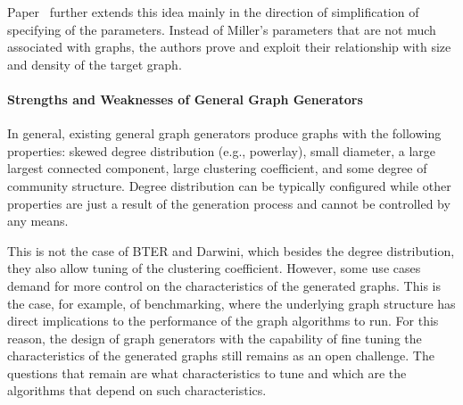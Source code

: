 Paper~\cite{DBLP:conf/wbdb/AmmarO13} further extends this idea mainly in the direction of simplification of specifying of the parameters. Instead of Miller's parameters that are not much associated with graphs, the authors prove and exploit their relationship with size and density of the target graph.

\paragraph{Strengths and Weaknesses of General Graph Generators}
In general, existing general graph generators produce graphs with the following
properties: skewed degree distribution (e.g., powerlay), small diameter, a large largest connected component, large
clustering coefficient, and some degree of
community structure. Degree distribution can be typically configured while other
properties are just a result of the generation process and cannot be controlled
by any means.

This is not the case of BTER and Darwini, which besides the degree distribution,
they also allow tuning of the clustering coefficient. However, some use cases
demand for more control on the characteristics of the generated graphs.
This is the case, for example, of benchmarking, where the underlying graph
structure has direct implications to the performance of the graph algorithms
to run. For this reason, the design of graph generators with the capability of fine
tuning the characteristics of the generated graphs still remains as an open
challenge. The questions that remain are what characteristics to tune
and which are the algorithms that depend on such characteristics.

